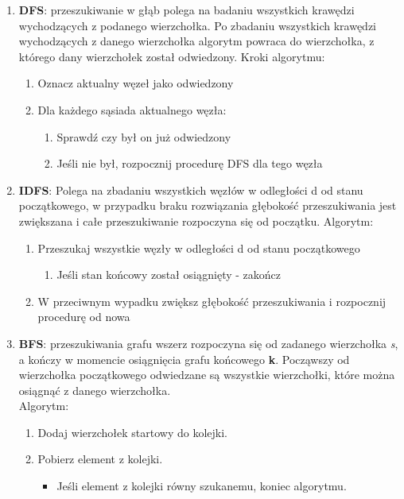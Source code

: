 \documentclass{classrep}
\begin{document}
		\begin{enumerate}
			\item \textbf{DFS}: przeszukiwanie w głąb polega na badaniu wszystkich krawędzi wychodzących z podanego wierzchołka. Po zbadaniu wszystkich krawędzi wychodzących z danego wierzchołka algorytm powraca do wierzchołka, z którego dany wierzchołek został odwiedzony.
			Kroki algorytmu:
			\begin{enumerate}
				\item Oznacz aktualny węzeł jako odwiedzony
				\item Dla każdego sąsiada aktualnego węzła:
				\begin{enumerate}
					\item Sprawdź czy był on już odwiedzony
					\item Jeśli nie był, rozpocznij procedurę DFS dla tego węzła
				\end{enumerate}
			\end{enumerate}
			\item \textbf{IDFS}: Polega na zbadaniu wszystkich węzłów w odległości d od stanu początkowego, w przypadku braku rozwiązania głębokość przeszukiwania jest zwiększana i całe przeszukiwanie rozpoczyna się od początku.
			Algorytm:
			\begin{enumerate}
				\item Przeszukaj wszystkie węzły w odległości d od stanu początkowego
				\begin{enumerate}
					\item Jeśli stan końcowy został osiągnięty - zakończ
				\end{enumerate}
				\item W przeciwnym wypadku zwiększ głębokość przeszukiwania i rozpocznij procedurę od nowa
			\end{enumerate}
			\item \textbf{BFS}: przeszukiwania grafu wszerz rozpoczyna się od zadanego wierzchołka \textit{s},
			a kończy w momencie osiągnięcia grafu końcowego \textbf{k}. Począwszy od wierzchołka
			początkowego odwiedzane są wszystkie wierzchołki, które można osiągnąć z danego wierzchołka.\\
			Algorytm:
			\begin{enumerate}
				\item Dodaj wierzchołek startowy do kolejki.
				\item Pobierz element z kolejki.
				\begin{itemize}
					\item Jeśli element z kolejki równy szukanemu, koniec algorytmu.

\end{itemize}
\end{enumerate}
\end{enumerate}
\end{document}
